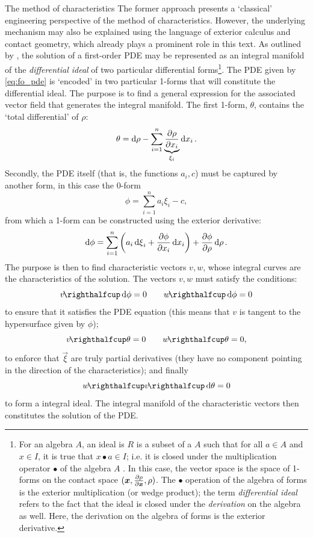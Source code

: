 \begin{aside}{The method of characteristics}
    The former approach presents a `classical' engineering perspective of the method of characteristics. However, the underlying mechanism may also be explained using the language of exterior calculus and contact geometry, which already plays a prominent role in this text. As outlined by \citet{Burke1985}, the solution of a first-order PDE may be represented as an integral manifold of the \emph{differential ideal} of two particular differential forms\footnote{For an algebra $A$, an ideal is $R$ is a subset of a $A$ such that for all $a \in A$ and $x \in I$, it is true that $x \bullet a \in I$; i.e. it is closed under the multiplication operator $\bullet$ of the algebra $A$ \cite{Schuller2014}. In this case, the vector space is the space of 1-forms on the contact space $(\vec{x}, \pdv{\rho}{\vec{x}}, \rho)$. The $\bullet$ operation of the algebra of forms is the exterior multiplication (or wedge product); the term \emph{differential ideal} refers to the fact that the ideal is closed under the \emph{derivation} on the algebra as well. Here, the derivation on the algebra of forms is the exterior derivative.}.
    The PDE given by \cref{eq:fo_pde} is `encoded' in two particular 1-forms that will constitute the differential ideal. The purpose is to find a general expression for the associated vector field that generates the integral manifold. The first 1-form, $\theta$, contains the `total differential' of $\rho$:
    $$ \theta = \dd{\rho} - \sum_{i = 1}^n\underbrace{\pdv{\rho}{x_i}}_{\xi_i}\dd{x}_i. $$
    Secondly, the PDE itself (that is, the functions $a_i, c$) must be captured by another form, in this case the 0-form
    $$ \phi = \sum_{i = 1}^n a_i\xi_i - c, $$
    from which a 1-form can be constructed using the exterior derivative:
    $$ \dd{\phi} = \sum_{i=1}^n \qty( a_i\dd{\xi}_i + \pdv{\phi}{x_i}\dd{x}_i) + \pdv{\phi}{\rho}\dd{\rho}.$$
    The purpose is then to find characteristic vectors $v, w$, whose integral curves are the characteristics of the solution. The vectors $v, w$ must satisfy the conditions: \cite[p. 215]{Burke1985}
    \begin{equation}
        \intpr{v}{\dd{\phi}} = 0 \qquad \intpr{w}{\dd{\phi}} = 0
        \label{eq:v_cond_1}
    \end{equation}
    to ensure that it satisfies the PDE equation (this means that $v$ is tangent to the hypersurface given by $\phi$);
    \begin{equation}
        \intpr{v}{\theta} = 0 \qquad \intpr{w}{\theta} = 0,
        \label{eq:v_cond_2}
    \end{equation}
    to enforce that $\vec{\xi}$ are truly partial derivatives (they have no component pointing in the direction of the characteristics); and finally
    \begin{equation}
        \intpr{w}{\intpr{v}{\dd{\theta}}} = 0
        \label{eq:v_cond_3}
    \end{equation}
    to form a integral ideal. The integral manifold of the characteristic vectors then constitutes the solution of the PDE.
\end{aside}

